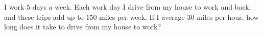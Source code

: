 I work $5$ days a week. Each work day I drive from my house to work and back, and these trips add up to $150$ miles per week. If I average $30$ miles per hour, how long does it take to drive from my house to work?

